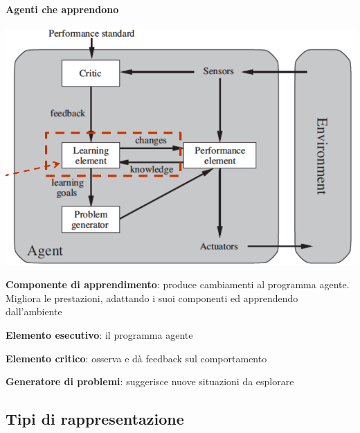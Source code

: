 \documentclass[10pt]{book}
\begin{document}
\paragraph{Agenti che apprendono}
\begin{center}
	\includegraphics[scale=0.5]{agappr.png}
\end{center}
\begin{list}{}{}
	\item \textbf{Componente di apprendimento}: produce cambiamenti al programma agente. Migliora le prestazioni, adattando i suoi componenti ed apprendendo dall'ambiente
	\item \textbf{Elemento esecutivo}: il programma agente
	\item \textbf{Elemento critico}: osserva e dà feedback sul comportamento
	\item \textbf{Generatore di problemi}: suggerisce nuove situazioni da esplorare
\end{list}
\subsection{Tipi di rappresentazione}
\end{document}
